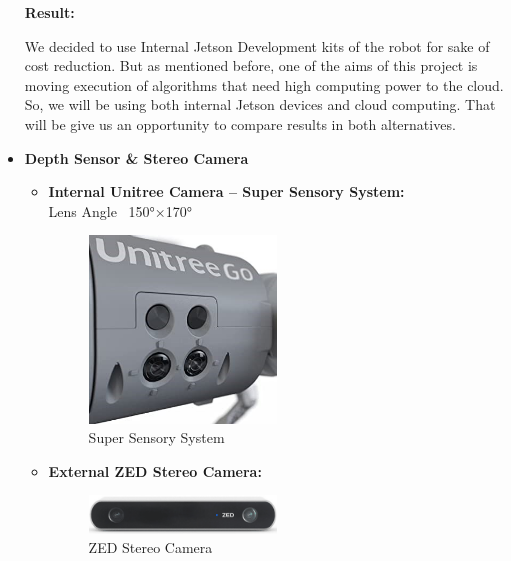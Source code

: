 \documentclass[12pt]{article}
\begin{document}
\begin{itemize}
            \textbf{Result:} 

            We decided to use Internal Jetson Development kits of the robot for sake of cost reduction. But as mentioned before, one of the aims of this project is moving execution of algorithms that need high computing power to the cloud. So, we will be using both internal Jetson devices and cloud computing. That will be give us an opportunity to compare results in both alternatives. 

        \item \textbf{Depth Sensor \& Stereo Camera}
            \begin{itemize}
                \item \textbf{Internal Unitree Camera – Super Sensory System:} \\
                Lens Angle ~150°×170° 

                \begin{figure}[H]
                    \centering
                    \includegraphics[width=0.5\textwidth]{SuperSensorySystem.png}
                    \caption{Super Sensory System}
                \end{figure}

                \item \textbf{External ZED Stereo Camera:} \\
                
                \begin{figure}[H]
                    \centering
                    \includegraphics[width=0.5\textwidth]{ZEDCam.png}
                    \caption{ZED Stereo Camera~\cite{ZEDStereoCamera}}
                \end{figure}


\end{itemize}
\end{itemize}
\end{document}
